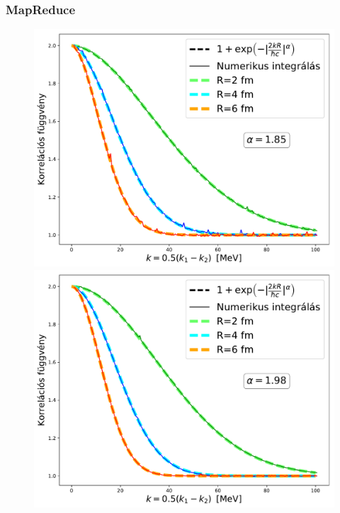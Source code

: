 \documentclass[10pt,a4paper]{article}
\numberwithin{equation}{subsection}
\numberwithin{figure}{section}
\begin{document}
\subsubsection{MapReduce}\label{sec:MapReduce}

\begin{figure}[H]
\centering
\includegraphics[scale=0.36]{pic/Coulomb/C2_noCoulomb_R246_a185.pdf}
\includegraphics[scale=0.36]{pic/Coulomb/C2_noCoulomb_R246_a198.pdf}
\end{figure}
\end{document}
